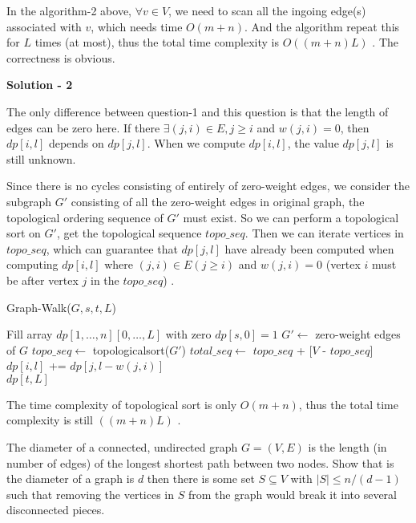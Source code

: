 \documentclass{article}
\newcounter{exercise}
\newcommand{\<}{
    \langle}
\renewcommand{\>}{
    \rangle}
\begin{document}
{In the algorithm-2 above, $\forall{v} \in V$, we need to scan all the ingoing edge(s) associated with $v$, which needs time $O(m+n)$. And the algorithm repeat this for $L$ times (at most), thus the total time complexity is $O((m+n)L)$ . The correctness is obvious.


\bigskip
\noindent \textbf{Solution - 2}

The only difference between question-1 and this question is that the length of edges can be zero here. If there $\exists (j,i) \in E, j \ge i$ and $w(j,i) = 0$, then $dp[i, l]$ depends on $dp[j, l]$. When we compute $dp[i, l]$, the value $dp[j, l]$ is still unknown.

Since there is no cycles consisting of entirely of zero-weight edges, we consider the subgraph $G'$ consisting of all the zero-weight edges in original graph, the topological ordering sequence of $G'$ must exist. So we can perform a topological sort on $G'$, get the topological sequence $topo\_seq$. Then we can iterate vertices in $topo\_seq$, which can guarantee that $dp[j, l]$ have already been computed when computing $dp[i,l]$ where $(j, i) \in E (j \ge i) $ and $w(j,i) = 0$ (vertex $i$ must be after vertex $j$ in the $topo\_seq$) .

\newpage

\begin{algorithm}[htb]
\caption{Graph-Walk($G, s, t, L$)}
\begin{algorithmic}[1]
\State Fill array $dp[1, \dots, n][0, \dots, L]$ with zero
\State $dp[s, 0] = 1$
\State $G' \leftarrow$ zero-weight edges of $G$
\State $topo\_seq \leftarrow$ topologicalsort($G'$) 
\State $total\_seq \leftarrow$ $topo\_seq$ + [$V$ - $topo\_seq$]
        \State $dp[i, l]$ += $dp[j, l-w(j, i)]$
        \EndFor
    \EndFor
\EndFor \\
\Return $dp[t, L]$
\end{algorithmic}
\end{algorithm}

The time complexity of topological sort is only $O(m+n)$, thus the total time complexity is still $((m+n)L)$ .


\begin{exercise}
The diameter of a connected, undirected graph $G=(V,E)$ is the length (in number of edges) of the longest shortest path between two nodes. Show that is the diameter of a graph is $d$ then there is some set $S\subseteq V$ with $|S|\leq n/(d-1)$ such that removing the vertices in $S$ from the graph would break it into several disconnected pieces.


\end{exercise}}
\end{document}
